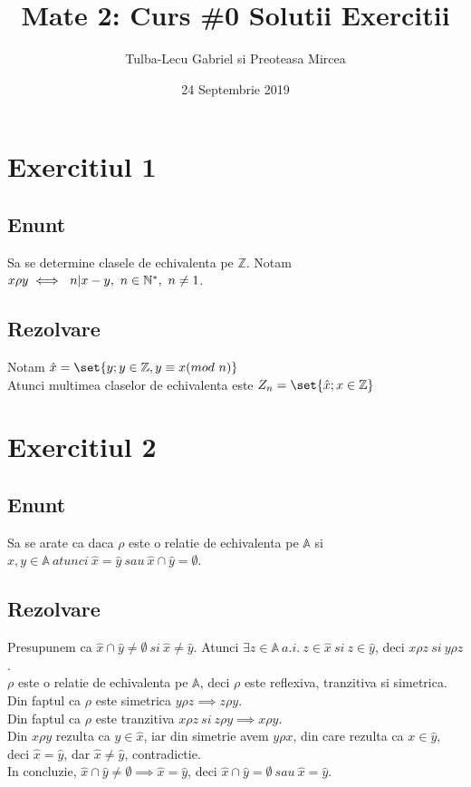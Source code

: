 \documentclass{article}
\title{Mate 2: Curs \#0 Solutii Exercitii}
\author{Tulba-Lecu Gabriel si Preoteasa Mircea}
\date{24 Septembrie 2019}
\newcommand{\A}{\mathbb A}
\newcommand{\Z}{\mathbb Z}
\newcommand{\Npos}{\mathbb{N}^{*}}
\begin{document}
    \maketitle

    \section{Exercitiul 1}
        \subsection{Enunt}
            Sa se determine clasele de echivalenta pe $\Z$. Notam $x \rho y \iff\ n | x-y,\\ \ n \in \Npos,\ n \neq 1$.
        \subsection{Rezolvare}
            Notam $\hat{x} = \set{y; y \in \Z, y \equiv x (mod\ n)}$\\
            Atunci multimea claselor de echivalenta este $Z_n = \set{\hat{x};x \in \Z}$
    \section{Exercitiul 2}
        \subsection{Enunt}
            Sa se arate ca daca $\rho$ este o relatie de echivalenta pe $\A$ si $x,y \in \A\ atunci\ \hat{x} = \hat{y}\ sau\ \hat{x} \cap \hat{y} = \emptyset$.
        \subsection{Rezolvare}
            Presupunem ca $\hat{x} \cap \hat{y} \neq \emptyset\ si\ \hat{x} \neq \hat{y}$. Atunci $\exists z \in \A \ a.i.\ z \in \hat{x}\ si\ z \in \hat{y}$, deci $x \rho z\ si\ y \rho z$.\\ 
            $\rho$ este o relatie de echivalenta pe $\A$, deci $\rho$ este reflexiva, tranzitiva si simetrica.\\
            Din faptul ca $\rho$ este simetrica $y \rho z \implies z \rho y$.\\
            Din faptul ca $\rho$ este tranzitiva $x \rho z\ si\ z \rho y \implies x \rho y$.\\
            Din $x \rho y$ rezulta ca $y \in \hat{x}$, iar din simetrie avem $y \rho x$, din care rezulta ca $x \in \hat{y}$, deci $\hat{x} = \hat{y}$, dar $\hat{x} \neq \hat{y}$, contradictie.\\
            In concluzie, $\hat{x} \cap \hat{y} \neq \emptyset \implies \hat{x} = \hat{y}$, deci $\hat{x} \cap \hat{y} = \emptyset\ sau\ \hat{x}=\hat{y}$.
\end{document}
